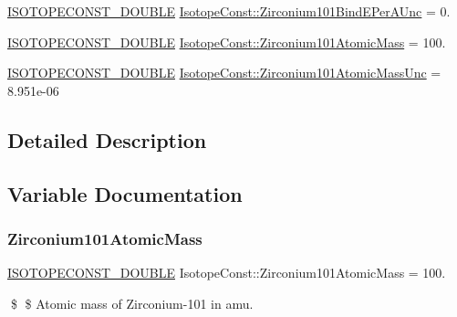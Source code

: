 \begin{DoxyCompactItemize}
\mbox{\hyperlink{group___isotope_const-_macros_ga8f45a7272ce02c0b4c65c44636ed719a}{I\+S\+O\+T\+O\+P\+E\+C\+O\+N\+S\+T\+\_\+\+D\+O\+U\+B\+LE}} \mbox{\hyperlink{group___isotope_const-_zirconium-_zr101_gac1b41abcd80273d257e94b9877be92dc}{Isotope\+Const\+::\+Zirconium101\+Bind\+E\+Per\+A\+Unc}} = 0.
\item 
\mbox{\hyperlink{group___isotope_const-_macros_ga8f45a7272ce02c0b4c65c44636ed719a}{I\+S\+O\+T\+O\+P\+E\+C\+O\+N\+S\+T\+\_\+\+D\+O\+U\+B\+LE}} \mbox{\hyperlink{group___isotope_const-_zirconium-_zr101_gad27b8911be33327bdfa3af0766fb4bc6}{Isotope\+Const\+::\+Zirconium101\+Atomic\+Mass}} = 100.
\item 
\mbox{\hyperlink{group___isotope_const-_macros_ga8f45a7272ce02c0b4c65c44636ed719a}{I\+S\+O\+T\+O\+P\+E\+C\+O\+N\+S\+T\+\_\+\+D\+O\+U\+B\+LE}} \mbox{\hyperlink{group___isotope_const-_zirconium-_zr101_ga2c42b786048a4470d096034175e51465}{Isotope\+Const\+::\+Zirconium101\+Atomic\+Mass\+Unc}} = 8.\+951e-\/06
\end{DoxyCompactItemize}


\subsection{Detailed Description}


\subsection{Variable Documentation}
\mbox{\label{group___isotope_const-_zirconium-_zr101_gad27b8911be33327bdfa3af0766fb4bc6}} 
\subsubsection{\texorpdfstring{Zirconium101\+Atomic\+Mass}{Zirconium101AtomicMass}}
{\footnotesize\ttfamily \mbox{\hyperlink{group___isotope_const-_macros_ga8f45a7272ce02c0b4c65c44636ed719a}{I\+S\+O\+T\+O\+P\+E\+C\+O\+N\+S\+T\+\_\+\+D\+O\+U\+B\+LE}} Isotope\+Const\+::\+Zirconium101\+Atomic\+Mass = 100.}

\$ \$ Atomic mass of Zirconium-\/101 in amu. \mbox{\label{group___isotope_const-_zirconium-_zr101_ga2c42b786048a4470d096034175e51465}} 
